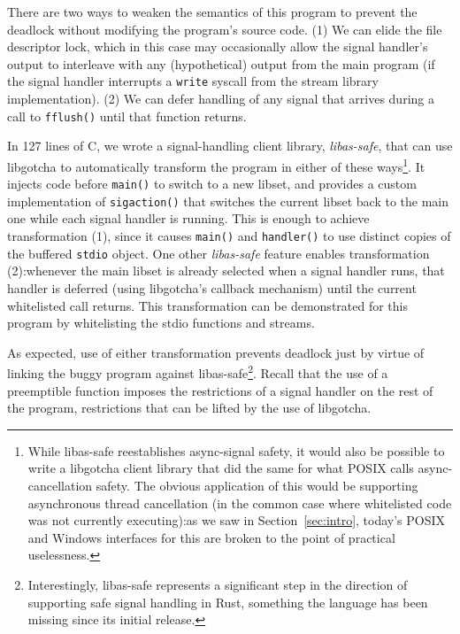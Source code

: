 There are two ways to weaken the semantics of this program to prevent the deadlock
without modifying the program's source code.  (1) We can elide the file descriptor
lock, which in this case may occasionally allow the signal handler's output to
interleave with any (hypothetical) output from the main program (if the signal
handler interrupts a \texttt{write} syscall from the stream library implementation).
(2) We can defer handling of any signal that arrives during a call to
\texttt{fflush()} until that function returns.

In 127 lines of C, we wrote a signal-handling client library, \textit{libas-safe},
that can use libgotcha to automatically transform the program in either of these
ways\footnote{While libas-safe reestablishes async-signal safety, it would also be
possible to write a libgotcha client library that did the same for what POSIX calls
async-cancellation safety.  The obvious application of this would be supporting
asynchronous thread cancellation (in the common case where whitelisted code was not
currently executing):\@ as we saw in Section~\ref{sec:intro}, today's POSIX and
Windows interfaces for this are broken to the point of practical uselessness.}.  It
injects code before \texttt{main()} to switch to a new libset, and provides a custom
implementation of \texttt{sigaction()} that switches the current libset back to the
main one while each signal handler is running.  This is enough to achieve
transformation (1), since it causes \texttt{main()} and \texttt{handler()} to use
distinct copies of the buffered \texttt{stdio} object.  One other \textit{libas-safe}
feature enables transformation (2):\@ whenever the main libset is already selected
when a signal handler runs, that handler is deferred (using libgotcha's callback
mechanism) until the current whitelisted call returns.  This transformation can be
demonstrated for this program by whitelisting the stdio functions and streams.

As expected, use of either transformation prevents deadlock just by virtue of linking
the buggy program against libas-safe\footnote{Interestingly, libas-safe represents a
significant step in the direction of supporting safe signal handling in Rust,
something the language has been missing since its initial release.}.  Recall that the
use of a preemptible function imposes the restrictions of a signal handler on the
rest of the program, restrictions that can be lifted by the use of libgotcha.
